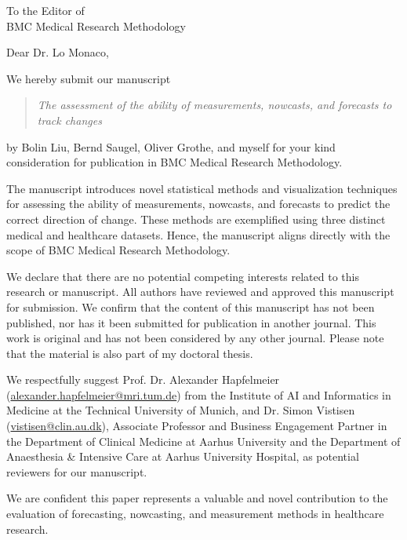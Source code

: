 \documentclass[%
 KITletter, %
fromemail,fromurl, %
 USenglish,%
  backaddress=off,
foldmarks=off,
 ]{scrlttr2}
\begin{document}

\def\pagename{} %

\begin{letter}{%
To the Editor of \\ BMC Medical Research Methodology
}

\opening{Dear Dr. Lo Monaco,}

We hereby submit our manuscript

\begin{quote}
\textit{The assessment of the ability of measurements, nowcasts, and forecasts to track changes}
\end{quote}

by Bolin Liu, Bernd Saugel, Oliver Grothe, and myself for your kind consideration for publication in BMC Medical Research Methodology.

The manuscript introduces novel statistical methods and visualization techniques for assessing the ability of measurements, nowcasts, and forecasts to predict the correct direction of change.
These methods are exemplified using three distinct medical and healthcare datasets.
Hence, the manuscript aligns directly with the scope of BMC Medical Research Methodology.

We declare that there are no potential competing interests related to this research or manuscript.
All authors have reviewed and approved this manuscript for submission.
We confirm that the content of this manuscript has not been published, nor has it been submitted for publication in another journal.
This work is original and has not been considered by any other journal.
Please note that the material is also part of my doctoral thesis.

We respectfully suggest Prof. Dr. Alexander Hapfelmeier (\url{alexander.hapfelmeier@mri.tum.de}) from the Institute of AI and Informatics in Medicine at the Technical University of Munich, and Dr. Simon Vistisen (\url{vistisen@clin.au.dk}), Associate Professor and Business Engagement Partner in the Department of Clinical Medicine at Aarhus University and the Department of Anaesthesia \& Intensive Care at Aarhus University Hospital, as potential reviewers for our manuscript.

We are confident this paper represents a valuable and novel contribution to the evaluation of forecasting, nowcasting, and measurement methods in healthcare research.


\closing{}

\end{letter}
\end{document}

